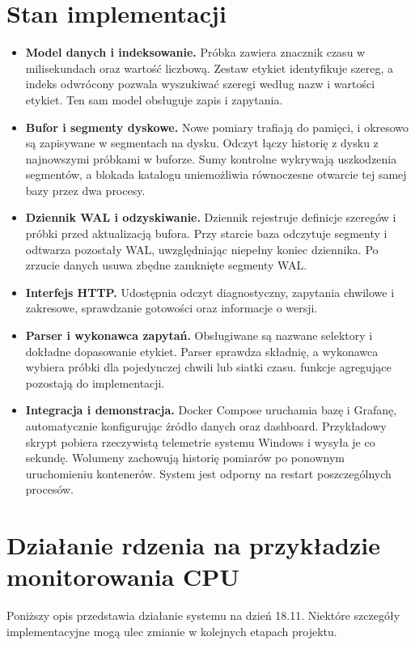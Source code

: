 \documentclass[11pt,a4paper]{article}
\begin{document}
\section{Stan implementacji}
\begin{itemize}
	\item \textbf{Model danych i indeksowanie.}
	      Próbka zawiera znacznik czasu w milisekundach oraz wartość liczbową.
	      Zestaw etykiet identyfikuje szereg, a indeks odwrócony pozwala wyszukiwać
	      szeregi według nazw i wartości etykiet. Ten sam model obsługuje zapis i zapytania.

	\item \textbf{Bufor i segmenty dyskowe.}
	      Nowe pomiary trafiają do pamięci, i okresowo są
	      zapisywane w segmentach na dysku. Odczyt łączy historię z dysku z najnowszymi próbkami
	      w buforze. Sumy kontrolne wykrywają uszkodzenia segmentów, a blokada katalogu
	      uniemożliwia równoczesne otwarcie tej samej bazy przez dwa procesy.

	\item \textbf{Dziennik WAL i odzyskiwanie.}
	      Dziennik rejestruje definicje szeregów i próbki przed aktualizacją bufora.
	      Przy starcie baza odczytuje segmenty i odtwarza pozostały WAL, uwzględniając
	      niepełny koniec dziennika. Po zrzucie danych usuwa zbędne zamknięte segmenty WAL.

	\item \textbf{Interfejs HTTP.}
	      Udostępnia odczyt diagnostyczny, zapytania chwilowe
	      i zakresowe, sprawdzanie gotowości oraz informacje o wersji.

	\item \textbf{Parser i wykonawca zapytań.}
	      Obsługiwane są nazwane selektory i dokładne dopasowanie etykiet.
	      Parser sprawdza składnię, a wykonawca wybiera próbki dla pojedynczej chwili
	      lub siatki czasu. funkcje agregujące pozostają do implementacji.

	\item \textbf{Integracja i demonstracja.}
	      Docker Compose uruchamia bazę i Grafanę, automatycznie konfigurując źródło
	      danych oraz dashboard. Przykładowy skrypt pobiera rzeczywistą telemetrie
	      systemu Windows i wysyła je co sekundę. Wolumeny zachowują historię
	      pomiarów po ponownym uruchomieniu kontenerów. System jest odporny na restart
	      poszczególnych procesów.
\end{itemize}

\clearpage
\section{Działanie rdzenia na przykładzie monitorowania CPU}
Poniższy opis przedstawia działanie systemu na dzień 18.11. Niektóre
szczegóły implementacyjne mogą ulec zmianie w kolejnych etapach projektu.
\end{document}
